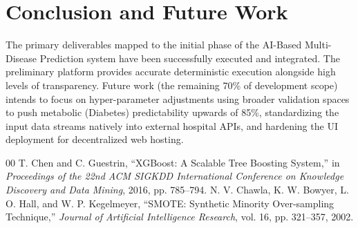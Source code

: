 \documentclass[conference]{IEEEtran}
\begin{document}
\section{Conclusion and Future Work}
The primary deliverables mapped to the initial phase of the AI-Based Multi-Disease Prediction system have been successfully executed and integrated. The preliminary platform provides accurate deterministic execution alongside high levels of transparency. Future work (the remaining 70\% of development scope) intends to focus on hyper-parameter adjustments using broader validation spaces to push metabolic (Diabetes) predictability upwards of 85\%, standardizing the input data streams natively into external hospital APIs, and hardening the UI deployment for decentralized web hosting.

\begin{thebibliography}{00}
 T. Chen and C. Guestrin, ``XGBoost: A Scalable Tree Boosting System,'' in \textit{Proceedings of the 22nd ACM SIGKDD International Conference on Knowledge Discovery and Data Mining}, 2016, pp. 785--794.
 N. V. Chawla, K. W. Bowyer, L. O. Hall, and W. P. Kegelmeyer, ``SMOTE: Synthetic Minority Over-sampling Technique,'' \textit{Journal of Artificial Intelligence Research}, vol. 16, pp. 321--357, 2002.
\end{thebibliography}
\end{document}
